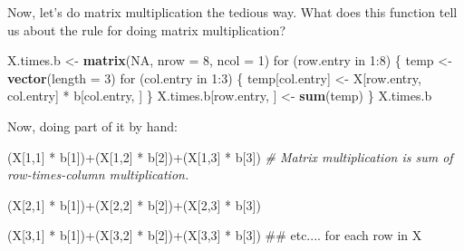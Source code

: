\documentclass[10pt,]{article}
\newenvironment{Shaded}{\begin{snugshade}}{\end{snugshade}}
\newcommand{\KeywordTok}[1]{\textcolor[rgb]{0.13,0.29,0.53}{\textbf{{#1}}}}
\newcommand{\DataTypeTok}[1]{\textcolor[rgb]{0.13,0.29,0.53}{{#1}}}
\newcommand{\DecValTok}[1]{\textcolor[rgb]{0.00,0.00,0.81}{{#1}}}
\newcommand{\StringTok}[1]{\textcolor[rgb]{0.31,0.60,0.02}{{#1}}}
\newcommand{\CommentTok}[1]{\textcolor[rgb]{0.56,0.35,0.01}{\textit{{#1}}}}
\newcommand{\OtherTok}[1]{\textcolor[rgb]{0.56,0.35,0.01}{{#1}}}
\newcommand{\NormalTok}[1]{{#1}}
\begin{document}
Now, let's do matrix multiplication the tedious way. What does this
function tell us about the rule for doing matrix multiplication?

\begin{Shaded}
\begin{Highlighting}[]
\NormalTok{X.times.b <-}\StringTok{ }\KeywordTok{matrix}\NormalTok{(}\OtherTok{NA}\NormalTok{, }\DataTypeTok{nrow =} \DecValTok{8}\NormalTok{, }\DataTypeTok{ncol =} \DecValTok{1}\NormalTok{)}
\NormalTok{for (row.entry in }\DecValTok{1}\NormalTok{:}\DecValTok{8}\NormalTok{) \{}
    \NormalTok{temp <-}\StringTok{ }\KeywordTok{vector}\NormalTok{(}\DataTypeTok{length =} \DecValTok{3}\NormalTok{)}
    \NormalTok{for (col.entry in }\DecValTok{1}\NormalTok{:}\DecValTok{3}\NormalTok{) \{}
        \NormalTok{temp[col.entry] <-}\StringTok{ }\NormalTok{X[row.entry, col.entry] *}\StringTok{ }\NormalTok{b[col.entry, ]}
    \NormalTok{\}}
    \NormalTok{X.times.b[row.entry, ] <-}\StringTok{ }\KeywordTok{sum}\NormalTok{(temp)}
\NormalTok{\}}
\NormalTok{X.times.b}
\end{Highlighting}
\end{Shaded}

Now, doing part of it by hand:

\begin{Shaded}
\begin{Highlighting}[]
\NormalTok{(X[}\DecValTok{1}\NormalTok{,}\DecValTok{1}\NormalTok{] *}\StringTok{ }\NormalTok{b[}\DecValTok{1}\NormalTok{])+(X[}\DecValTok{1}\NormalTok{,}\DecValTok{2}\NormalTok{] *}\StringTok{ }\NormalTok{b[}\DecValTok{2}\NormalTok{])+(X[}\DecValTok{1}\NormalTok{,}\DecValTok{3}\NormalTok{] *}\StringTok{ }\NormalTok{b[}\DecValTok{3}\NormalTok{])  }\CommentTok{# Matrix multiplication is sum of row-times-column multiplication.}

\NormalTok{(X[}\DecValTok{2}\NormalTok{,}\DecValTok{1}\NormalTok{] *}\StringTok{ }\NormalTok{b[}\DecValTok{1}\NormalTok{])+(X[}\DecValTok{2}\NormalTok{,}\DecValTok{2}\NormalTok{] *}\StringTok{ }\NormalTok{b[}\DecValTok{2}\NormalTok{])+(X[}\DecValTok{2}\NormalTok{,}\DecValTok{3}\NormalTok{] *}\StringTok{ }\NormalTok{b[}\DecValTok{3}\NormalTok{])}

\NormalTok{(X[}\DecValTok{3}\NormalTok{,}\DecValTok{1}\NormalTok{] *}\StringTok{ }\NormalTok{b[}\DecValTok{1}\NormalTok{])+(X[}\DecValTok{3}\NormalTok{,}\DecValTok{2}\NormalTok{] *}\StringTok{ }\NormalTok{b[}\DecValTok{2}\NormalTok{])+(X[}\DecValTok{3}\NormalTok{,}\DecValTok{3}\NormalTok{] *}\StringTok{ }\NormalTok{b[}\DecValTok{3}\NormalTok{])}
\NormalTok{## etc.... for each row in X}
\end{Highlighting}
\end{Shaded}
\end{document}
